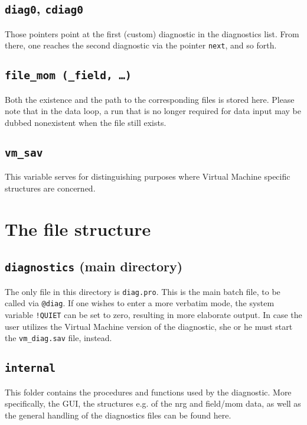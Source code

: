 \documentclass[12pt]{article}
\begin{document}
\subsection{\texttt{diag0}, \texttt{cdiag0}}

Those pointers point at the first (custom) diagnostic in the
diagnostics list. From there, one reaches the second diagnostic
via the pointer \texttt{next}, and so forth.

\subsection{\texttt{file\_mom (\_field, \dots)}}

Both the existence and the path to the corresponding files is
stored here. Please note that in the data loop, a run that is no
longer required for data input may be dubbed nonexistent when the
file still exists.

\subsection{\texttt{vm\_sav}}

This variable serves for distinguishing purposes where Virtual
Machine specific structures are concerned.


\section{The file structure}

\subsection{\texttt{diagnostics} (main directory)}

The only file in this directory is \texttt{diag.pro}. This is the
main batch file, to be called via \texttt{@diag}. If one wishes to
enter a more verbatim mode, the system variable \texttt{!QUIET}
can be set to zero, resulting in more elaborate output. In case
the user utilizes the Virtual Machine version of the diagnostic,
she or he must start the \texttt{vm\_diag.sav} file, instead.

\subsection{\texttt{internal}}

This folder contains the procedures and functions used by the
diagnostic. More specifically, the GUI, the structures e.g. 
of the nrg and field/mom data, as well as the general 
handling of the diagnostics files can be found here.
\end{document}

